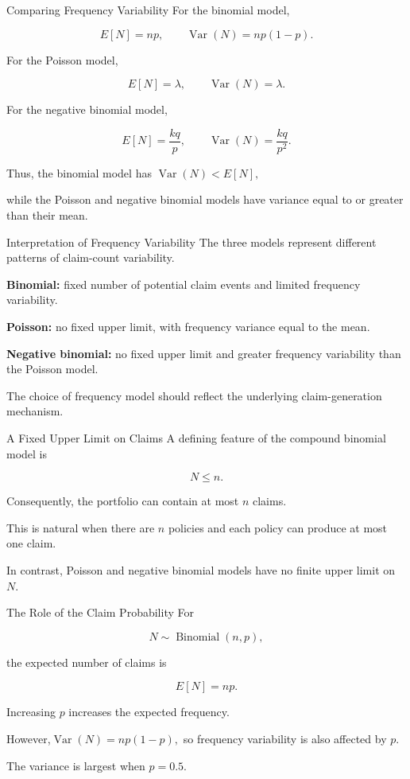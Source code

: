 \documentclass[
  ignorenonframetext,
  aspectratio=169,
]{beamer}
\begin{document}
\begin{frame}{Comparing Frequency Variability}
\protect{}\label{comparing-frequency-variability}
For the binomial model,

\[
E[N]=np,
\qquad
\operatorname{Var}(N)=np(1-p).
\]

For the Poisson model,

\[
E[N]=\lambda,
\qquad
\operatorname{Var}(N)=\lambda.
\]

For the negative binomial model,

\[
E[N]=\frac{kq}{p},
\qquad
\operatorname{Var}(N)=\frac{kq}{p^2}.
\]

Thus, the binomial model has \(\operatorname{Var}(N)<E[N],\)

while the Poisson and negative binomial models have variance equal to or
greater than their mean.
\end{frame}

\begin{frame}{Interpretation of Frequency Variability}
\protect{}\label{interpretation-of-frequency-variability}
The three models represent different patterns of claim-count
variability.

\textbf{Binomial:} fixed number of potential claim events and limited
frequency variability.

\textbf{Poisson:} no fixed upper limit, with frequency variance equal to
the mean.

\textbf{Negative binomial:} no fixed upper limit and greater frequency
variability than the Poisson model.

The choice of frequency model should reflect the underlying
claim-generation mechanism.
\end{frame}

\begin{frame}{A Fixed Upper Limit on Claims}
\protect{}\label{a-fixed-upper-limit-on-claims}
A defining feature of the compound binomial model is

\[
N\leq n.
\]

Consequently, the portfolio can contain at most \(n\) claims.

This is natural when there are \(n\) policies and each policy can
produce at most one claim.

In contrast, Poisson and negative binomial models have no finite upper
limit on \(N\).
\end{frame}

\begin{frame}{The Role of the Claim Probability}
\protect{}\label{the-role-of-the-claim-probability}
For

\[
N\sim\operatorname{Binomial}(n,p),
\]

the expected number of claims is

\[
E[N]=np.
\]

Increasing \(p\) increases the expected frequency.

However,\(\operatorname{Var}(N)=np(1-p),\) so frequency variability is
also affected by \(p\).

The variance is largest when \(p=0.5\).
\end{frame}
\end{document}

